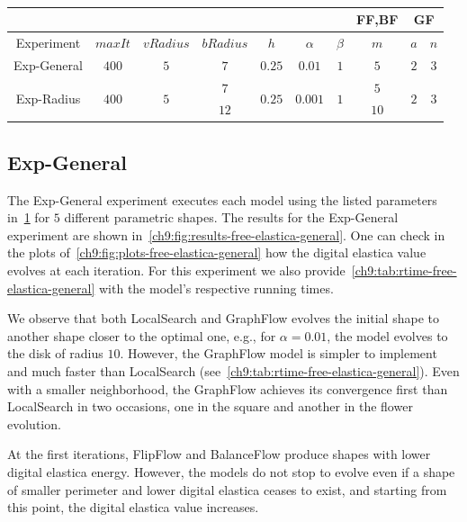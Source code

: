 \begin{table}
\centering
\begin{tabular}{|c|c|c|c|c|c|c|c|c|c|}
\cline{8-10}
\multicolumn{7}{c|}{} & FF,BF & \multicolumn{2}{|c|}{GF}\\
\hline
Experiment & $maxIt$ & $vRadius$ & $bRadius$ & $h$ & $\alpha$ & $\beta$  & $m$ & $a$ & $n$ \\
\hline
Exp-General & $400$ & $5$ & $7$ & $0.25$ & $0.01$ & $1$  & $5$ & $2$ & $3$ \\
\hline
\multirow{2}{*}{Exp-Radius} & \multirow{2}{*}{$400$} & \multirow{2}{*}{$5$} & $7$ & \multirow{2}{*}{$0.25$} &  \multirow{2}{*}{$0.001$} & \multirow{2}{*}{$1$}  & $5$ & \multirow{2}{*}{$2$} & \multirow{2}{*}{$3$} \\
& &  & $12$ & &  & & $10$ & &  \\
\hline
\end{tabular}
\caption{}
\label{ch9:tab:free-elastica-parameters-summary}
\end{table}

\subsection{Exp-General}

  The Exp-General experiment executes each model using the listed parameters in~\cref{ch9:tab:free-elastica-parameters-summary} for $5$ different parametric shapes. The results for the Exp-General experiment are shown in~\cref{ch9:fig:results-free-elastica-general}. One can check in the plots of~\cref{ch9:fig:plots-free-elastica-general} how the digital elastica value evolves at each iteration. For this experiment we also provide~\cref{ch9:tab:rtime-free-elastica-general} with the model's respective running times.
  

We observe that both LocalSearch and GraphFlow evolves the initial shape to another shape closer to the optimal one, e.g., for $\alpha=0.01$, the model evolves to the disk of radius $10$. However, the GraphFlow model is simpler to implement and much faster than LocalSearch (see~\cref{ch9:tab:rtime-free-elastica-general}). Even with a smaller neighborhood, the GraphFlow achieves its convergence first than LocalSearch in two occasions, one in the square and another in the flower evolution.

At the first iterations, FlipFlow and BalanceFlow produce shapes with lower digital elastica energy. However, the models do not stop to evolve even if a shape of smaller perimeter and lower digital elastica ceases to exist, and starting from this point, the digital elastica value increases.


